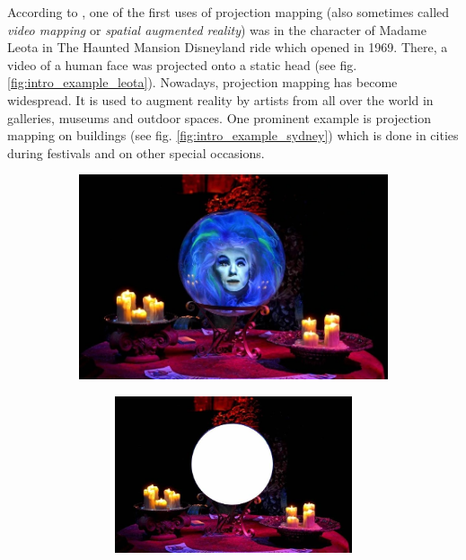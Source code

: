 According to \citet*{WikiHauntedMansion}, one of the first uses of projection mapping (also sometimes called \textit{video mapping} or \textit{spatial augmented reality}) was in the character of Madame Leota in The Haunted Mansion Disneyland ride which opened in 1969. There, a video of a human face was projected onto a static head (see fig. \ref{fig:intro_example_leota}). Nowadays, projection mapping has become widespread. It is used to augment reality by artists from all over the world in galleries, museums and outdoor spaces. One prominent example is projection mapping on buildings (see fig. \ref{fig:intro_example_sydney}) which is done in cities during festivals and on other special occasions.

\begin{figure}[ht]
    \centering
    \begin{subfigure}{0.6\textwidth}
        \centering
        \includegraphics[width=\textwidth]{images/01-Leota.jpg}
        \caption{}
        \label{fig:intro_example_leota-full}
    \end{subfigure}
    \hfill
    \begin{subfigure}{0.39\textwidth}
        \centering
        \begin{subfigure}{\textwidth}
            \centering
            \includegraphics[width=\textwidth]{images/01-Leota-no_head.jpg}
            \caption{}
            \label{fig:intro_example_leota-scene}
        \end{subfigure}
        

\end{subfigure}
\end{figure}
